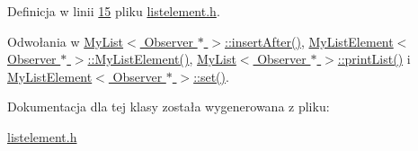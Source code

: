 Definicja w linii \hyperlink{listelement_8h_source_l00015}{15} pliku \hyperlink{listelement_8h_source}{listelement.\-h}.



Odwołania w \hyperlink{mylist_8h_source_l00212}{My\-List$<$ Observer $\ast$ $>$\-::insert\-After()}, \hyperlink{mylistelement_8h_source_l00038}{My\-List\-Element$<$ Observer $\ast$ $>$\-::\-My\-List\-Element()}, \hyperlink{mylist_8h_source_l00156}{My\-List$<$ Observer $\ast$ $>$\-::print\-List()} i \hyperlink{mylistelement_8h_source_l00063}{My\-List\-Element$<$ Observer $\ast$ $>$\-::set()}.



Dokumentacja dla tej klasy została wygenerowana z pliku\-:\begin{DoxyCompactItemize}
\item 
\hyperlink{listelement_8h}{listelement.\-h}\end{DoxyCompactItemize}
